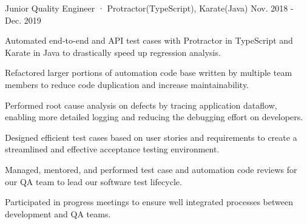 \begin{cventries}
\cventry
  {Junior Quality Engineer · Protractor(TypeScript), Karate(Java)} %
  {} %
  {} %
  {Nov. 2018 - Dec. 2019} %
  {
    \begin{cvitems} %
      \item {Automated end-to-end and API test cases with Protractor in TypeScript and Karate in Java to drastically speed up regression analysis.}
      \item {Refactored larger portions of automation code base written by multiple team members to reduce code duplication and increase maintainability.}
      \item {Performed root cause analysis on defects by tracing application dataflow, enabling more detailed logging and reducing the debugging effort on developers.}
      \item {Designed efficient test cases based on user stories and requirements to create a streamlined and effective acceptance testing environment.}
      \item {Managed, mentored, and performed test case and automation code reviews for our QA team to lead our software test lifecycle.}
      \item {Participated in progress meetings to ensure well integrated processes between development and QA teams.}
    \end{cvitems}
  }


\end{cventries}
